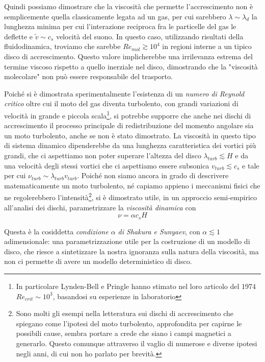 \documentclass[a4paperbi]{article}
\begin{document}
	Quindi possiamo dimostrare che la viscosità che permette l'accrescimento non è semplicemente quella classicamente legata ad un gas, per cui sarebbero $\lambda\sim\lambda_d$ la lunghezza minima per cui l'interazione reciproca fra le particelle del gas le deflette e $\tilde{v}\sim c_s$ velocità del suono. In questo caso, utilizzando risultati della fluidodinamica, troviamo che sarebbe $Re_{mol}\gtrsim10^4$ in regioni interne a un tipico disco di accrescimento. Questo valore implicherebbe una irrilevanza estrema del termine viscoso rispetto a quello inerziale nel disco, dimostrando che la "viscosità molecolare" non può essere responsabile del trasporto.
	
	Poiché si è dimostrata sperimentalmente l'esistenza di un \textit{numero di Reynold critico} oltre cui il moto del gas diventa turbolento, con grandi variazioni di velocità in grande e piccola scala\footnote{In particolare Lynden-Bell e Pringle hanno stimato nel loro articolo del 1974 $Re_{crit}\sim 10^3$, basandosi su esperienze in laboratorio}, si potrebbe supporre che anche nei dischi di accrescimento il processo principale di redistribuzione del momento angolare sia un moto turbolento, anche se non è stato dimostrato.
	La viscosità in questo tipo di sistema dinamico dipenderebbe da una lunghezza caratteristica dei vortici più grandi, che ci aspettiamo non poter superare l'altezza del disco $\lambda_{turb}\lesssim H$ e da una velocità degli stessi vortici che ci aspettiamo essere subsonica $v_{turb}\lesssim c_s$ e tale per cui $\nu_{turb}\sim \lambda_{turb}v_{turb}$.
	Poiché non siamo ancora in grado di descrivere matematicamente un moto turbolento, né capiamo appieno i meccanismi fisici che ne regolerebbero l'intensità\footnote{Sono molti gli esempi nella letteratura sui dischi di accrescimento che spiegano come l'ipotesi del moto turbolento, approfondita per capirne le possibili cause, sembra portare a crede che siano i campi magnetici a generarlo. Questo comunque attraverso il vaglio di numerose e diverse ipotesi negli anni, di cui non ho parlato per brevità.}, si è dimostrato utile, in un approccio semi-empirico all'analisi dei dischi, parametrizzare la \textit{viscosità dinamica} con
	\begin{equation}
		\nu=\alpha c_s H
	\end{equation}
	
	Questa è la cosiddetta \textit{condizione $\alpha$ di Shakura e Sunyaev}, con $\alpha\lesssim 1$ adimensionale: una parametrizzazione utile per la costruzione di un modello di disco, che riesce a sintetizzare la nostra ignoranza sulla natura della viscosità, ma non ci permette di avere un modello deterministico di disco.
	
\end{document}
